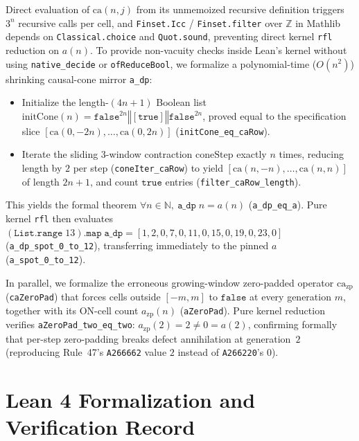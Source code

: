 \documentclass[11pt]{article}
\theoremstyle{definition}
\newcommand{\N}{\mathbb{N}}
\newcommand{\Z}{\mathbb{Z}}
\newcommand{\seq}[1]{\texttt{#1}}
\newcommand{\ca}{\mathrm{ca}}
\newcommand{\btrue}{\mathtt{true}}
\newcommand{\bfalse}{\mathtt{false}}
\begin{document}
Direct evaluation of $\ca(n, j)$ from its unmemoized recursive definition triggers $3^n$ recursive calls per cell, and \texttt{Finset.Icc} / \texttt{Finset.filter} over $\Z$ in Mathlib depends on \texttt{Classical.choice} and \texttt{Quot.sound}, preventing direct kernel \texttt{rfl} reduction on $a(n)$. To provide non-vacuity checks inside Lean's kernel without using \texttt{native\_decide} or \texttt{ofReduceBool}, we formalize a polynomial-time ($O(n^2)$) shrinking causal-cone mirror \texttt{a\_dp}:
\begin{itemize}
\item Initialize the length-$(4n + 1)$ Boolean list $\mathrm{initCone}(n) = \bfalse^{2n} \mathbin{\Vert} [\btrue] \mathbin{\Vert} \bfalse^{2n}$, proved equal to the specification slice $[\ca(0, -2n), \dots, \ca(0, 2n)]$ (\texttt{initCone\_eq\_caRow}).
\item Iterate the sliding $3$-window contraction $\mathrm{coneStep}$ exactly $n$ times, reducing length by $2$ per step (\texttt{coneIter\_caRow}) to yield $[\ca(n, -n), \dots, \ca(n, n)]$ of length $2n + 1$, and count $\btrue$ entries (\texttt{filter\_caRow\_length}).
\end{itemize}
This yields the formal theorem $\forall n \in \N,\ \mathtt{a\_dp}\; n = a(n)$ (\texttt{a\_dp\_eq\_a}). Pure kernel \texttt{rfl} then evaluates $(\mathtt{List.range}\; 13).\mathtt{map}\; \mathtt{a\_dp} = [1, 2, 0, 7, 0, 11, 0, 15, 0, 19, 0, 23, 0]$ (\texttt{a\_dp\_spot\_0\_to\_12}), transferring immediately to the pinned $a$ (\texttt{a\_spot\_0\_to\_12}).

In parallel, we formalize the erroneous growing-window zero-padded operator $\ca_{\mathrm{zp}}$ (\texttt{caZeroPad}) that forces cells outside $[-m, m]$ to $\bfalse$ at every generation $m$, together with its ON-cell count $a_{\mathrm{zp}}(n)$ (\texttt{aZeroPad}). Pure kernel reduction verifies \texttt{aZeroPad\_two\_eq\_two}: $a_{\mathrm{zp}}(2) = 2 \ne 0 = a(2)$, confirming formally that per-step zero-padding breaks defect annihilation at generation~$2$ (reproducing Rule~47's \seq{A266662} value $2$ instead of \seq{A266220}'s $0$).

\section{Lean 4 Formalization and Verification Record}
\end{document}

